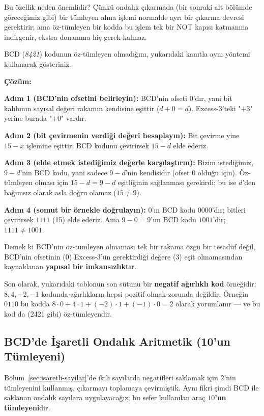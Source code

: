 Bu özellik neden önemlidir? Çünkü ondalık çıkarmada (bir sonraki alt bölümde göreceğimiz
gibi) bir tümleyen alma işlemi normalde ayrı bir çıkarma devresi gerektirir; ama
öz-tümleyen bir kodda bu işlem tek bir NOT kapısı katmanına indirgenir, ekstra donanıma hiç
gerek kalmaz.

\begin{alistirma}[\kolay]
BCD (\emph{8421}) kodunun öz-tümleyen olmadığını, yukarıdaki kanıtla aynı yöntemi
kullanarak gösteriniz.
\end{alistirma}

\noindent\textbf{Çözüm:}

\noindent\textbf{Adım 1 (BCD'nin ofsetini belirleyin):} BCD'nin ofseti $0$'dır, yani bit
kalıbının sayısal değeri rakamın kendisine eşittir ($d+0=d$). Excess-3'teki "$+3$" yerine
burada "$+0$" vardır.

\noindent\textbf{Adım 2 (bit çevirmenin verdiği değeri hesaplayın):} Bit çevirme yine
$15-x$ işlemine eşittir; BCD kodunu çevirirsek $15-d$ elde ederiz.

\noindent\textbf{Adım 3 (elde etmek istediğimiz değerle karşılaştırın):} Bizim istediğimiz,
$9-d$'nin BCD kodu, yani sadece $9-d$'nin kendisidir (ofset $0$ olduğu için). Öz-tümleyen
olması için $15-d=9-d$ eşitliğinin sağlanması gerekirdi; bu ise $d$'den bağımsız olarak
asla doğru olamaz ($15\neq9$).

\noindent\textbf{Adım 4 (somut bir örnekle doğrulayın):} $0$'ın BCD kodu $0000$'dır;
bitleri çevirirsek $1111$ (15) elde ederiz. Ama $9-0=9$'un BCD kodu $1001$'dir;
$1111\neq1001$.

Demek ki BCD'nin öz-tümleyen olmaması tek bir rakama özgü bir tesadüf değil, BCD'nin
ofsetinin ($0$) Excess-3'ün gerektirdiği değere ($3$) eşit olmamasından kaynaklanan
\textbf{yapısal bir imkansızlıktır}.

Son olarak, yukarıdaki tablonun son sütunu bir \textbf{negatif ağırlıklı kod}
örneğidir: $8,4,-2,-1$ kodunda ağırlıkların hepsi pozitif olmak zorunda değildir. Örneğin
$0110$ bu kodda $8\cdot0+4\cdot1+(-2)\cdot1+(-1)\cdot0=2$ olarak yorumlanır --- ve bu kod da
(2421 gibi) öz-tümleyendir.

\subsection{BCD'de İşaretli Ondalık Aritmetik (10'un Tümleyeni)}
\label{sec:bcd-isaretli-aritmetik}

Bölüm~\ref{sec:isaretli-sayilar}'de ikili sayılarda negatifleri saklamak için $2$'nin
tümleyenini kullanmış, çıkarmayı toplamaya çevirmiştik. Aynı fikri şimdi BCD ile saklanan
ondalık sayılara uygulayacağız; bu sefer kullanılan araç \textbf{$10$'un tümleyeni}dir.

